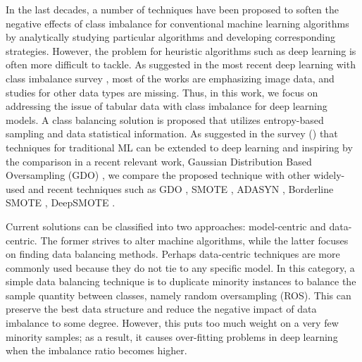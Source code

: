 \documentclass[journal]{IEEEtai}
\begin{document}
In the last decades, a number of techniques have been proposed to soften the negative effects of class imbalance for conventional machine learning algorithms by analytically studying particular algorithms and developing corresponding strategies. However, the problem for heuristic algorithms such as deep learning is often more difficult to tackle. As suggested in the most recent deep learning with class imbalance survey \cite{johnson_survey_2019}, most of the works are emphasizing image data, and studies for other data types are missing. Thus, in this work, we focus on addressing the issue of tabular data with class imbalance for deep learning models. A class balancing solution is proposed that utilizes entropy-based sampling and data statistical information. As suggested in the survey (\cite{johnson_survey_2019}) that techniques for traditional ML can be extended to deep learning and inspiring by the comparison in a recent relevant work, Gaussian Distribution Based Oversampling (GDO) \cite{bib:GDO}, we compare the proposed technique with other widely-used and recent techniques such as GDO \cite{bib:GDO}, SMOTE \cite{chawla_smote:_2002}, ADASYN \cite{ADASYN}, Borderline SMOTE \cite{bordersmote}, DeepSMOTE \cite{deepsmote}. 

Current solutions can be classified into two approaches: model-centric and data-centric. The former strives to alter machine algorithms, while the latter focuses on finding data balancing methods. Perhaps data-centric techniques are more commonly used because they do not tie to any specific model. In this category, a simple data balancing technique is to duplicate minority instances to balance the sample quantity between classes, namely random oversampling (ROS). This can preserve the best data structure and reduce the negative impact of data imbalance to some degree. However, this puts too much weight on a very few minority samples; as a result, it causes over-fitting problems in deep learning when the imbalance ratio becomes higher.
\end{document}
